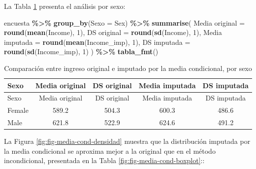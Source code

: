 \documentclass[
  spanish,
  12pt,
]{book}
\newenvironment{Shaded}{\begin{snugshade}}{\end{snugshade}}
\newcommand{\AttributeTok}[1]{\textcolor[rgb]{0.13,0.29,0.53}{#1}}
\newcommand{\DecValTok}[1]{\textcolor[rgb]{0.00,0.00,0.81}{#1}}
\newcommand{\FunctionTok}[1]{\textcolor[rgb]{0.13,0.29,0.53}{\textbf{#1}}}
\newcommand{\NormalTok}[1]{#1}
\newcommand{\OtherTok}[1]{\textcolor[rgb]{0.56,0.35,0.01}{#1}}
\newcommand{\SpecialCharTok}[1]{\textcolor[rgb]{0.81,0.36,0.00}{\textbf{#1}}}
\newcommand{\StringTok}[1]{\textcolor[rgb]{0.31,0.60,0.02}{#1}}
\begin{document}
La Tabla \ref{tab:tab-sesgo-media-cond-sexo} presenta el análisis por sexo:

\begin{Shaded}
\begin{Highlighting}[]
\NormalTok{encuesta }\SpecialCharTok{\%\textgreater{}\%}
  \FunctionTok{group\_by}\NormalTok{(}\AttributeTok{Sexo =}\NormalTok{ Sex) }\SpecialCharTok{\%\textgreater{}\%}
  \FunctionTok{summarise}\NormalTok{(}
    \StringTok{\textasciigrave{}}\AttributeTok{Media original}\StringTok{\textasciigrave{}}  \OtherTok{=} \FunctionTok{round}\NormalTok{(}\FunctionTok{mean}\NormalTok{(Income), }\DecValTok{1}\NormalTok{),}
    \StringTok{\textasciigrave{}}\AttributeTok{DS original}\StringTok{\textasciigrave{}}     \OtherTok{=} \FunctionTok{round}\NormalTok{(}\FunctionTok{sd}\NormalTok{(Income), }\DecValTok{1}\NormalTok{),}
    \StringTok{\textasciigrave{}}\AttributeTok{Media imputada}\StringTok{\textasciigrave{}}  \OtherTok{=} \FunctionTok{round}\NormalTok{(}\FunctionTok{mean}\NormalTok{(Income\_imp), }\DecValTok{1}\NormalTok{),}
    \StringTok{\textasciigrave{}}\AttributeTok{DS imputada}\StringTok{\textasciigrave{}}     \OtherTok{=} \FunctionTok{round}\NormalTok{(}\FunctionTok{sd}\NormalTok{(Income\_imp), }\DecValTok{1}\NormalTok{)}
\NormalTok{  ) }\SpecialCharTok{\%\textgreater{}\%} \FunctionTok{tabla\_fmt}\NormalTok{()}
\end{Highlighting}
\end{Shaded}

\begin{longtable}[]{@{}lcccc@{}}
\caption{\label{tab:tab-sesgo-media-cond-sexo}Comparación entre ingreso original e imputado por la media condicional, por sexo}\tabularnewline
\toprule\noalign{}
Sexo & Media original & DS original & Media imputada & DS imputada \\
\midrule\noalign{}
\endfirsthead
\toprule\noalign{}
Sexo & Media original & DS original & Media imputada & DS imputada \\
\midrule\noalign{}
\endhead
\bottomrule\noalign{}
\endlastfoot
Female & 589.2 & 504.3 & 600.3 & 486.6 \\
Male & 621.8 & 522.9 & 624.6 & 491.2 \\
\end{longtable}

La Figura \ref{fig:fig-media-cond-densidad} muestra que la distribución imputada por la media condicional se aproxima mejor a la original que en el método incondicional, presentada en la Tabla \ref{fig:fig-media-cond-boxplot}::
\end{document}
